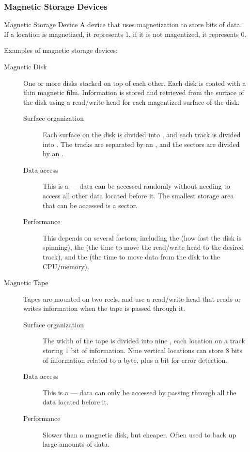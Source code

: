 \documentclass[\main/notes.tex]{subfiles}
\begin{document}
				\subsubsection{Magnetic Storage Devices}
					\begin{definition}{Magnetic Storage Device}
						A device that uses magnetization to store bits of data. If a location is magnetized, it represents $1$, if it is not magentized, it represents $0$.
					\end{definition}
					Examples of magnetic storage devices:
					\begin{indentparagraph}
						\begin{description}
							\item[Magnetic Disk] One or more disks stacked on top of each other. Each disk is coated with a thin magnetic film. Information is stored and retrieved from the surface of the disk using a read/write head for each magentized surface of the disk.
								\begin{description}
									\item[Surface organization] Each surface on the disk is divided into , and each track is divided into . The tracks are separated by an , and the sectors are divided by an .
									\item[Data access] This is a  --- data can be accessed randomly without needing to access all other data located before it. The smallest storage area that can be accessed is a sector.
									\item[Performance] This depends on several factors, including the  (how fast the disk is spinning), the  (the time to move the read/write head to the desired track), and the  (the time to move data from the disk to the CPU/memory).
								\end{description}
							\item[Magnetic Tape] Tapes are mounted on two reels, and use a read/write head that reads or writes information when the tape is passed through it.
								\begin{description}
									\item[Surface organization] The width of the tape is divided into nine , each location on a track storing $1$ bit of information. Nine vertical locations can store $8$ bits of information related to a byte, plus a bit for error detection.
									\item[Data access] This is a  --- data can only be accessed by passing through all the data located before it.
									\item[Performance] Slower than a magnetic disk, but cheaper. Often used to back up large amounts of data.  
								\end{description}
						\end{description}
					\end{indentparagraph}
\end{document}
